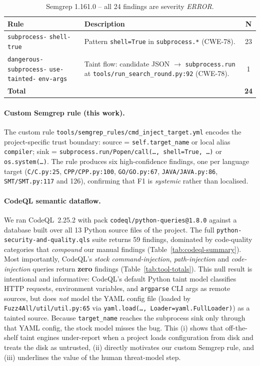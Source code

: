 \documentclass[conference]{IEEEtran}
\begin{document}
\begin{table}[t]
\caption{Semgrep 1.161.0 -- all 24 findings are severity \emph{ERROR}.}
\label{tab:semgrep-summary}
\centering\renewcommand{\arraystretch}{1.2}
\begin{tabularx}{\columnwidth}{p{}Xc}
\toprule
\textbf{Rule} & \textbf{Description} & \textbf{N} \\
\midrule
\texttt{subprocess-} \texttt{shell-true}
  & Pattern \texttt{shell=True} in \texttt{subprocess.*} (CWE-78). & 23 \\
\texttt{dangerous-} \texttt{subprocess-} \texttt{use-tainted-} \texttt{env-args}
  & Taint flow: candidate JSON $\rightarrow$ \texttt{subprocess.run} at \texttt{tools/run\_search\_round.py:92} (CWE-78). & 1  \\
\midrule
\multicolumn{2}{l}{\textbf{Total}} & \textbf{24} \\
\bottomrule
\end{tabularx}
\end{table}

\paragraph{Custom Semgrep rule (this work).}
The custom rule \texttt{tools/semgrep\_rules/cmd\_inject\_target.yml}
encodes the project-specific trust boundary: source =
\texttt{self.target\_name} or local alias \texttt{compiler}; sink =
\texttt{subprocess.run/Popen/call(\ldots, shell=True, \ldots)} or
\texttt{os.system(\ldots)}. The rule produces six high-confidence
findings, one per language target
(\texttt{C/C.py:25}, \texttt{CPP/CPP.py:100}, \texttt{GO/GO.py:67},
\texttt{JAVA/JAVA.py:86}, \texttt{SMT/SMT.py:117} and 126), confirming
that F1 is \emph{systemic} rather than localised.

\paragraph{CodeQL semantic dataflow.}
We ran CodeQL~2.25.2 with pack \texttt{codeql/python-queries@1.8.0}
against a database built over all 13 Python source files of the
project. The full \texttt{python-security-and-quality.qls} suite
returns 59 findings, dominated by code-quality categories that
\emph{compound} our manual findings (Table~\ref{tab:codeql-summary}).
Most importantly, CodeQL's \emph{stock command-injection},
\emph{path-injection} and \emph{code-injection} queries return
\textbf{zero} findings (Table~\ref{tab:tool-totals}). This null result
is intentional and informative: CodeQL's default Python taint model
classifies HTTP requests, environment variables, and \texttt{argparse}
CLI args as remote sources, but does \emph{not} model the YAML config
file (loaded by \texttt{Fuzz4All/util/util.py:65} via
\texttt{yaml.load(\ldots, Loader=yaml.FullLoader)}) as a tainted source.
Because \texttt{target\_name} reaches the subprocess sink only through
that YAML config, the stock model misses the bug. This (i) shows that
off-the-shelf taint engines under-report when a project loads
configuration from disk and treats the disk as untrusted, (ii) directly
motivates our custom Semgrep rule, and (iii) underlines the value of
the human threat-model step.
\end{document}
